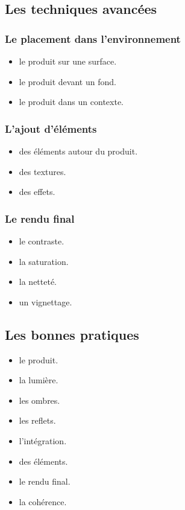 \subsection{Les techniques avancées}

\subsubsection{Le placement dans l'environnement}

\begin{itemize}
    \item {} le produit sur une surface.
    \item {} le produit devant un fond.
    \item {} le produit dans un contexte.
\end{itemize}

\subsubsection{L'ajout d'éléments}

\begin{itemize}
    \item {} des éléments autour du produit.
    \item {} des textures.
    \item {} des effets.
\end{itemize}

\subsubsection{Le rendu final}

\begin{itemize}
    \item {} le contraste.
    \item {} la saturation.
    \item {} la netteté.
    \item {} un vignettage.
\end{itemize}

\subsection{Les bonnes pratiques}

\begin{itemize}
    \item {} le produit.
    \item {} la lumière.
    \item {} les ombres.
    \item {} les reflets.
    \item {} l'intégration.
    \item {} des éléments.
    \item {} le rendu final.
    \item {} la cohérence.
\end{itemize}

